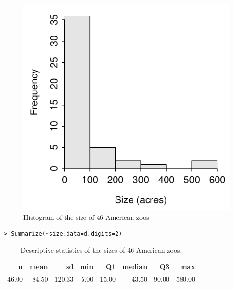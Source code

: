 \documentclass[10pt,openany]{book}\usepackage[]{graphicx}\usepackage[]{color}
\makeatletter
\newenvironment{kframe}{%
 \def\at@end@of@kframe{}%
 \ifinner\ifhmode%
  \def\at@end@of@kframe{\end{minipage}}%
  \begin{minipage}{\columnwidth}%
 \fi\fi%
 \def\FrameCommand##1{\hskip\@totalleftmargin \hskip-\fboxsep
 \colorbox{shadecolor}{##1}\hskip-\fboxsep
     \hskip-\linewidth \hskip-\@totalleftmargin \hskip\columnwidth}%
 \MakeFramed {\advance\hsize-\width
   \@totalleftmargin\z@ \linewidth\hsize
   \@setminipage}}%
 {\par\unskip\endMakeFramed%
 \at@end@of@kframe}
\newenvironment{knitrout}{}{} %
\makeatother
\begin{document}
\begin{itemize}
\begin{knitrout}
\begin{figure}[hbtp]
{\centering \includegraphics[width=.4\linewidth]{Figs/ZooHist-1} 

}

\caption[Histogram of the size of 46 American zoos]{Histogram of the size of 46 American zoos.}\label{fig:ZooHist}
\end{figure}


\end{knitrout}
\begin{knitrout}
\color{fgcolor}\begin{kframe}
\begin{verbatim}
> Summarize(~size,data=d,digits=2)
\end{verbatim}
\end{kframe}
\end{knitrout}
\begin{table}[ht]
\centering
\caption{Descriptive statistics of the sizes of 46 American zoos.} 
\label{tab:ZooSum}
\begin{tabular}{rrrrrrrr}
  \hline
n & mean & sd & min & Q1 & median & Q3 & max \\ 
  \hline
46.00 & 84.50 & 120.33 & 5.00 & 15.00 & 43.50 & 90.00 & 580.00 \\ 
   \hline
\end{tabular}
\end{table}

\end{itemize}




\end{document}
